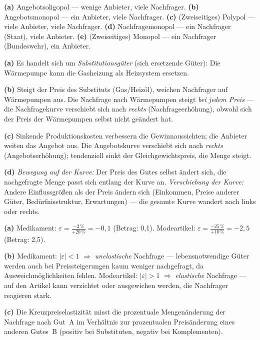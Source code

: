 \documentclass[11pt, a4paper]{article}
\begin{document}
\begin{loesung}[title={Lösung Aufgabe~4 --- Marktformen}]
\textbf{(a)} Angebotsoligopol --- wenige Anbieter, viele Nachfrager.
\textbf{(b)} Angebotsmonopol --- ein Anbieter, viele Nachfrager.
\textbf{(c)} (Zweiseitiges) Polypol --- viele Anbieter, viele Nachfrager.
\textbf{(d)} Nachfragemonopol --- ein Nachfrager (Staat), viele Anbieter.
\textbf{(e)} (Zweiseitiges) Monopol --- ein Nachfrager (Bundeswehr), ein Anbieter.
\end{loesung}

\begin{loesung}[title={Lösung Aufgabe~5 --- Bestimmungsfaktoren und Kurvenverschiebungen}]
\textbf{(a)} Es handelt sich um \emph{Substitutionsgüter} (sich ersetzende Güter): Die
Wärmepumpe kann die Gasheizung als Heizsystem ersetzen.

\textbf{(b)} Steigt der Preis des Substituts (Gas/Heizöl), weichen Nachfrager auf
Wärmepumpen aus. Die Nachfrage nach Wärmepumpen steigt \emph{bei jedem Preis} ---
die Nachfragekurve verschiebt sich nach \emph{rechts} (Nachfrageerhöhung), obwohl sich
der Preis der Wärmepumpen selbst nicht geändert hat.

\textbf{(c)} Sinkende Produktionskosten verbessern die Gewinnaussichten; die Anbieter
weiten das Angebot aus. Die Angebotskurve verschiebt sich nach \emph{rechts}
(Angebotserhöhung); tendenziell sinkt der Gleichgewichtspreis, die Menge steigt.

\textbf{(d)} \emph{Bewegung auf der Kurve:} Der Preis des Gutes selbst ändert sich, die
nachgefragte Menge passt sich entlang der Kurve an. \emph{Verschiebung der Kurve:} Andere
Einflussgrößen als der Preis ändern sich (Einkommen, Preise anderer Güter,
Bedürfnisstruktur, Erwartungen) --- die gesamte Kurve wandert nach links oder rechts.
\end{loesung}

\begin{loesung}[title={Lösung Aufgabe~6 --- Preiselastizität}]
\textbf{(a)} Medikament: $\varepsilon = \frac{-2\,\%}{+20\,\%} = -0{,}1$ (Betrag: 0,1).
Modeartikel: $\varepsilon = \frac{-25\,\%}{+10\,\%} = -2{,}5$ (Betrag: 2,5).

\textbf{(b)} Medikament: $|\varepsilon| < 1$ $\Rightarrow$ \emph{unelastische} Nachfrage ---
lebensnotwendige Güter werden auch bei Preissteigerungen kaum weniger nachgefragt, da
Ausweichmöglichkeiten fehlen. Modeartikel: $|\varepsilon| > 1$ $\Rightarrow$
\emph{elastische} Nachfrage --- auf den Artikel kann verzichtet oder ausgewichen werden,
die Nachfrager reagieren stark.

\textbf{(c)} Die Kreuzpreiselastizität misst die prozentuale Mengenänderung der Nachfrage
nach Gut~A im Verhältnis zur prozentualen Preisänderung eines anderen Gutes~B (positiv bei
Substituten, negativ bei Komplementen).
\end{loesung}
\end{document}
